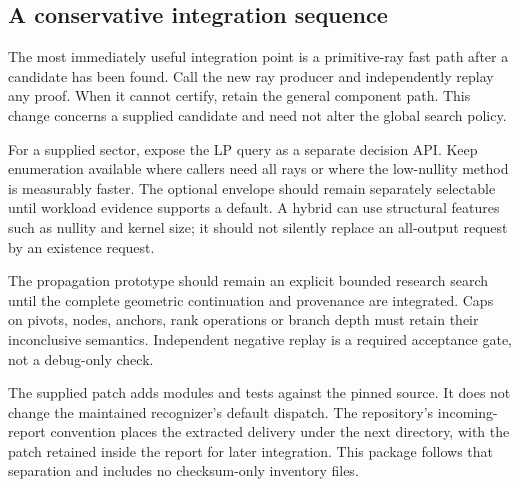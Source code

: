 \subsection{A conservative integration sequence}

The most immediately useful integration point is a primitive-ray fast path after a candidate has been found. Call the new ray producer and independently replay any  proof. When it cannot certify, retain the general component path. This change concerns a supplied candidate and need not alter the global search policy.

For a supplied sector, expose the LP query as a separate decision API. Keep enumeration available where callers need all rays or where the low-nullity method is measurably faster. The optional envelope should remain separately selectable until workload evidence supports a default. A hybrid can use structural features such as nullity and kernel size; it should not silently replace an all-output request by an existence request.

The propagation prototype should remain an explicit bounded research search until the complete geometric continuation and provenance are integrated. Caps on pivots, nodes, anchors, rank operations or branch depth must retain their inconclusive semantics. Independent negative replay is a required acceptance gate, not a debug-only check.

The supplied patch adds modules and tests against the pinned source. It does not change the maintained recognizer's default dispatch. The repository's incoming-report convention places the extracted delivery under the next  directory, with the patch retained inside the report for later integration. This package follows that separation and includes no checksum-only inventory files.
